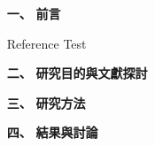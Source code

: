 \documentclass[12pt, a4paper,]{article}
\begin{document}
\begin{spacing}{1}
\begin{enumerate}
	\item [\bf \large 一、] {\bf \large 前言}

		Reference Test \cite{website:google}
	\item [\bf \large 二、]{\bf \large 研究目的與文獻探討}

	 \item [\bf \large 三、]{\bf \large 研究方法}

	 \item [\bf \large 四、]{\bf \large 結果與討論}
\end{enumerate}

 


\end{spacing}
\end{document}
